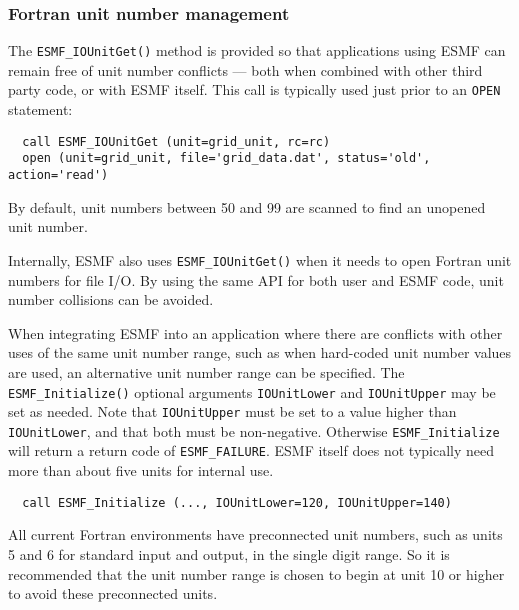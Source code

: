 

\subsubsection{Fortran unit number management} \label{fio:unitnumbers}
The {\tt ESMF\_IOUnitGet()} method is provided so that applications
using ESMF can remain free of unit number conflicts --- both when combined
with other third party code, or with ESMF itself.  This call is typically
used just prior to an {\tt OPEN} statement:

\begin{verbatim}
  call ESMF_IOUnitGet (unit=grid_unit, rc=rc)
  open (unit=grid_unit, file='grid_data.dat', status='old', action='read')
\end{verbatim}

By default, unit numbers between 50 and 99 are scanned to find an unopened
unit number.

Internally, ESMF also uses {\tt ESMF\_IOUnitGet()} when it needs to open
Fortran unit numbers for file I/O.  By using the same API for both user and
ESMF code, unit number collisions can be avoided.

When integrating ESMF into an application where there are conflicts with
other uses of the same unit number range, such as when hard-coded unit number
values are used, an alternative unit number range can be specified.
The {\tt ESMF\_Initialize()} optional arguments {\tt IOUnitLower} and {\tt IOUnitUpper}
may be set as needed.  Note that {\tt IOUnitUpper} must be set to a value higher than
{\tt IOUnitLower}, and that both must be non-negative.  Otherwise {\tt ESMF\_Initialize}
will return a return code of {\tt ESMF\_FAILURE}.  ESMF itself does not typically need more
than about five units for internal use.

\begin{verbatim}
  call ESMF_Initialize (..., IOUnitLower=120, IOUnitUpper=140)
\end{verbatim}

All current Fortran environments have preconnected unit numbers, such as
units 5 and 6 for standard input and output, in the single digit range.
So it is recommended that the unit number range is chosen to begin at unit 10
or higher to avoid these preconnected units.

